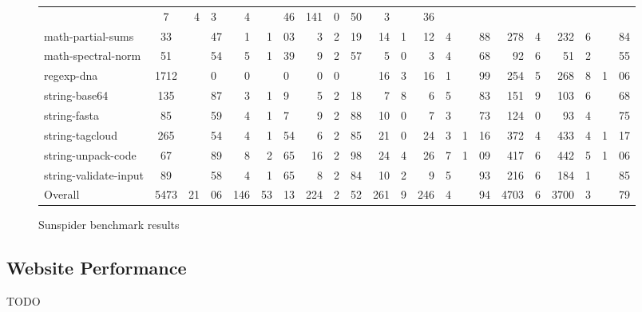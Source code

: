 \begin{figure*}
\begin{tabular}{|l|c|r@{.}lr|r@{.}lr|r@{.}l|r@{.}lr@{.}l|r@{.}l|r@{.}lr@{.}l|r@{.}l|}
    & 7&4  & 3&4 & &46   & 141&0 & 50&3  & &36 \\
math-partial-sums        & 33  & &47 & 1   & 1&03 & 3  & 2&19
    & 14&1 & 12&4 & &88  & 278&4 & 232&6 & &84 \\
math-spectral-norm       & 51  & &54 & 5   & 1&39 & 9  & 2&57
    & 5&0  & 3&4 & &68   & 92&6  & 51&2  & &55 \\
regexp-dna               & 1712 & &0 & 0   & &0 & 0    & 0&
    & 16&3 & 16&1 & &99  & 254&5 & 268&8 & 1&06 \\
string-base64            & 135 & &87 & 3   & 1&9 & 5   & 2&18
    & 7&8  & 6&5 & &83   & 151&9 & 103&6 & &68 \\
string-fasta             & 85  & &59 & 4   & 1&7 & 9   & 2&88
    & 10&0 & 7&3 & &73   & 124&0 & 93&4  & &75 \\
string-tagcloud          & 265 & &54 & 4   & 1&54 & 6  & 2&85
    & 21&0 & 24&3 & 1&16 & 372&4 & 433&4 & 1&17 \\
string-unpack-code       & 67  & &89 & 8   & 2&65 & 16 & 2&98
    & 24&4 & 26&7 & 1&09 & 417&6 & 442&5 & 1&06 \\
string-validate-input    & 89  & &58 & 4   & 1&65 & 8  & 2&84
    & 10&2 & 9&5 & &93   & 216&6 & 184&1 & &85 \\

\hline

Overall                  & 5473 & 21&06 & 146 & 53&13 & 224 & 2&52
    & 261&9 & 246&4 & &94 & 4703&6 & 3700&3 & &79 \\

\hline

\end{tabular}
\caption{Sunspider benchmark results}
\end{figure*}

\subsection{Website Performance}

TODO
